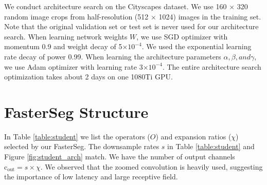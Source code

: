 \documentclass{article} \usepackage{iclr2020_conference,times}
\begin{document}
We conduct architecture search on the Cityscapes dataset. We use 160 $\times$ 320 random image crops from half-resolution (512 $\times$ 1024) images in the training set. Note that the original validation set or test set is never used for our architecture search. When learning network weights $W$, we use SGD optimizer with momentum 0.9 and weight decay of 5$\times10^{-4}$. We used the exponential learning rate decay of power 0.99. When learning the architecture parameters $\alpha, \beta, and \gamma$, we use Adam optimizer with learning rate 3$\times10^{-4}$. The entire architecture search optimization takes about 2 days on one 1080Ti GPU.


\section{FasterSeg Structure}\vspace{-0.7em} \label{app:fasterseg}
In Table \ref{table:student} we list the operators ($O$) and expansion ratios ($\chi$) selected by our FasterSeg. The downsample rates $s$ in Table \ref{table:student} and Figure \ref{fig:student_arch} match. We have the number of output channels $\mathrm{c_{out}} = s \times \chi$. We observed that the zoomed convolution is heavily used, suggesting the importance of low latency and large receptive field.
\end{document}
